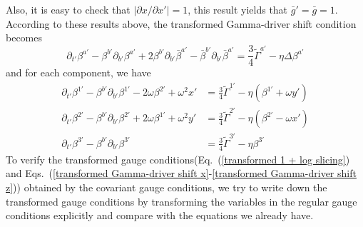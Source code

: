 Also, it is easy to check that $\left|\partial x/\partial x'\right| = 1$, this result yields that ${\bar g}' = {\bar g} = 1$. According to these results above, the transformed Gamma-driver shift condition becomes
\begin{equation}
\partial_{t'}\beta^{a'} - \beta^{b'}\partial_{b'}\beta^{a'} + 2\beta^{b'}\partial_{b'}{\bar \beta}^{a'} - {\bar \beta}^{b'}\partial_{b'}{\bar \beta}^{a'} = \frac{3}{4}{\tilde \Gamma}^{a'} - \eta \Delta \beta^{a'}
\end{equation}
and for each component, we have
\begin{align}
\partial_{t'}\beta^{1'} - \beta^{b'}\partial_{b'}\beta^{1'} - 2\omega\beta^{2'} + \omega^{2}x' &= \frac{3}{4}{\tilde \Gamma}^{1'} - \eta \left(\beta^{1'} + \omega y'\right)\label{transformed Gamma-driver shift x}\\
\partial_{t'}\beta^{2'} - \beta^{b'}\partial_{b'}\beta^{2'} + 2\omega\beta^{1'} + \omega^{2}y' &= \frac{3}{4}{\tilde \Gamma}^{2'} - \eta \left(\beta^{2'} - \omega x'\right)\label{transformed Gamma-driver shift y}\\
\partial_{t'}\beta^{3'} - \beta^{b'}\partial_{b'}\beta^{3'} & = \frac{3}{4}{\tilde \Gamma}^{3'} - \eta \beta^{3'}\label{transformed Gamma-driver shift z}
\end{align}
To verify the transformed gauge conditions(Eq.~(\ref{transformed 1 + log slicing}) and Eqs.~(\ref{transformed Gamma-driver shift x}-\ref{transformed Gamma-driver shift z})) obtained by the covariant gauge conditions, we try to write down the transformed gauge conditions by transforming the variables in the regular gauge conditions explicitly and compare with the equations we already have. 


